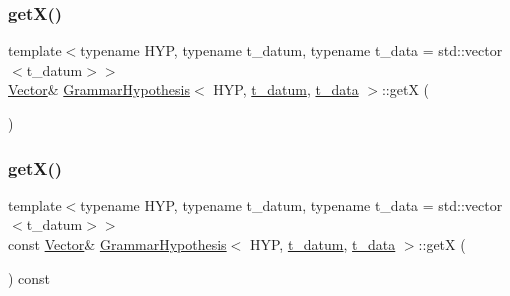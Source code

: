 \mbox{\label{class_grammar_hypothesis_a379e7af54d3e1cfd5b70f48fcc423470}} 
\subsubsection{\texorpdfstring{get\+X()}{getX()}\hspace{0.1cm}{\footnotesize\ttfamily [1/2]}}
{\footnotesize\ttfamily template$<$typename H\+YP, typename t\+\_\+datum, typename t\+\_\+data = std\+::vector$<$t\+\_\+datum$>$$>$ \\
\hyperlink{_eigen_numerics_8h_aca2956bc379bce2ed88ab3c0e1b61d1d}{Vector}\& \hyperlink{class_grammar_hypothesis}{Grammar\+Hypothesis}$<$ H\+YP, \hyperlink{class_bayesable_a7c93a2eeab708378eb321745908718d4}{t\+\_\+datum}, \hyperlink{class_bayesable_a70a593a67c7d43239ecc06bb4fd06a6b}{t\+\_\+data} $>$\+::getX (\begin{DoxyParamCaption}{ }\end{DoxyParamCaption})\hspace{0.3cm}{\ttfamily [inline]}}

\mbox{\label{class_grammar_hypothesis_a2e6e231336e00b27bb0a0a1f039d80fa}} 
\subsubsection{\texorpdfstring{get\+X()}{getX()}\hspace{0.1cm}{\footnotesize\ttfamily [2/2]}}
{\footnotesize\ttfamily template$<$typename H\+YP, typename t\+\_\+datum, typename t\+\_\+data = std\+::vector$<$t\+\_\+datum$>$$>$ \\
const \hyperlink{_eigen_numerics_8h_aca2956bc379bce2ed88ab3c0e1b61d1d}{Vector}\& \hyperlink{class_grammar_hypothesis}{Grammar\+Hypothesis}$<$ H\+YP, \hyperlink{class_bayesable_a7c93a2eeab708378eb321745908718d4}{t\+\_\+datum}, \hyperlink{class_bayesable_a70a593a67c7d43239ecc06bb4fd06a6b}{t\+\_\+data} $>$\+::getX (\begin{DoxyParamCaption}{ }\end{DoxyParamCaption}) const\hspace{0.3cm}{\ttfamily [inline]}}

